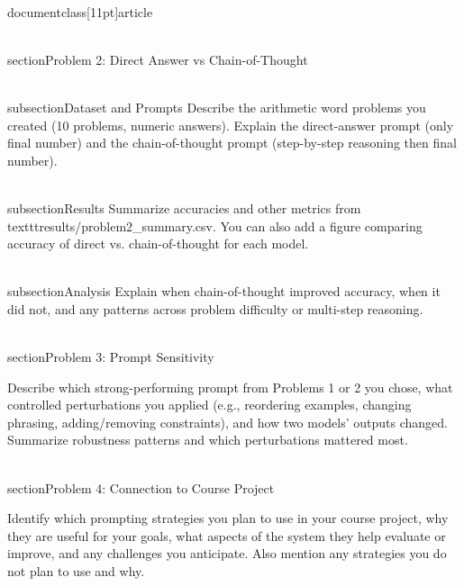 \\documentclass[11pt]{article}
\begin{document}
\\section{Problem 2: Direct Answer vs Chain-of-Thought}

\\subsection{Dataset and Prompts}
Describe the arithmetic word problems you created (10 problems, numeric answers). Explain the direct-answer prompt (only final number) and the chain-of-thought prompt (step-by-step reasoning then final number).

\\subsection{Results}
Summarize accuracies and other metrics from \\texttt{results/problem2\_summary.csv}. You can also add a figure comparing accuracy of direct vs. chain-of-thought for each model.


\\subsection{Analysis}
Explain when chain-of-thought improved accuracy, when it did not, and any patterns across problem difficulty or multi-step reasoning.

\\section{Problem 3: Prompt Sensitivity}

Describe which strong-performing prompt from Problems 1 or 2 you chose, what controlled perturbations you applied (e.g., reordering examples, changing phrasing, adding/removing constraints), and how two models' outputs changed. Summarize robustness patterns and which perturbations mattered most.

\\section{Problem 4: Connection to Course Project}

Identify which prompting strategies you plan to use in your course project, why they are useful for your goals, what aspects of the system they help evaluate or improve, and any challenges you anticipate. Also mention any strategies you do not plan to use and why.

\
\end{document}

